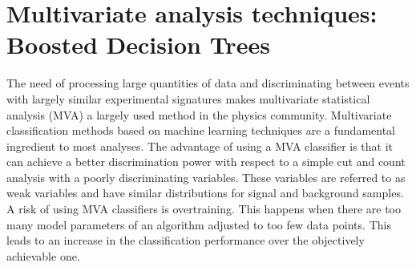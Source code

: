 \section{Multivariate analysis techniques: Boosted Decision Trees}
The need of processing large quantities of data and discriminating between events with largely similar experimental signatures makes multivariate statistical analysis (MVA) a largely used method in the physics community. Multivariate classification methods based on machine learning techniques are a fundamental ingredient to most analyses. The advantage of using a MVA classifier is that it can achieve a better discrimination power with respect to a simple cut and count analysis with a poorly discriminating variables. These variables are referred to as weak variables and have similar distributions for signal and background samples. 
A risk of using MVA classifiers is overtraining.  This happens when there are too many model parameters of an algorithm adjusted to too few data points. This leads to an increase in the classification performance over the objectively achievable one.

